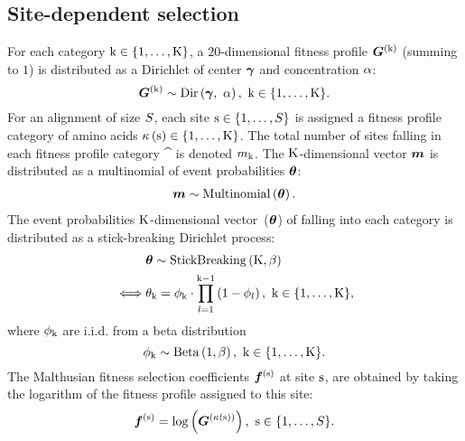 \subsection{Site-dependent selection}
\label{sec:profiles}
For each category $\text{k} \in \{1, \hdots, \text{K}\}$, a $20$-dimensional fitness profile $\bm{G}^{(\text{k})}$ (summing to $1$) is distributed as a Dirichlet of center $\bm{\gamma}$ and concentration $\alpha$:
\begin{equation}
    \label{eq:DistribBase}
    \Base\catexp \sim \mathrm{Dir}\left( \Basecenter,\ \baseconc \right),\ \Setcat.
\end{equation}
For an alignment of size $S$, each site $\text{s} \in \{1, \hdots, S\}$ is assigned a fitness profile category of amino acids $\kappa\left(\text{s}\right) \in \{1, \hdots, \text{K}\} $.
The total number of sites falling in each fitness profile category $\cat$ is denoted $m_{\text{k}}$.
The $\text{K}$-dimensional vector $\bm{m}$ is distributed as a multinomial of event probabilities $\bm{\theta}$:
\begin{align}
    \label{eq:DistribMultinomial}
    \catMultiVar \sim \mathrm{Multinomial}\left( \StickBreaking \right).
\end{align}
The event probabilities $\text{K}$-dimensional vector~($\bm{\theta}$) of falling into each category is distributed as a stick-breaking Dirichlet process:
\begin{align}
    \label{eq:DistribStickBreaking}
    \begin{split}
        & \StickBreaking \sim \mathrm{StickBreaking}\left( \Ncat, \stickbreakinghyper \right)\\
        \iff & \stickbreaking_{\cat} = \stick_{\cat}\cdot \prod _{{\indice=1}}^{{\cat-1}}\left(1-\stick_{\indice}\right),\ \Setcat,
    \end{split}
\end{align}
where $\phi_{\text{k}}$ are i.i.d.
from a beta distribution
\begin{equation}
    \label{eq:Beta}
    \stick_{\cat} \sim \mathrm{Beta}\left( 1, \stickbreakinghyper \right),\ \Setcat.
\end{equation}
The Malthusian fitness selection coefficients $\bm{f}^{(\text{s})}$ at site $\text{s}$, are obtained by taking the logarithm of the fitness profile assigned to this site:
\begin{equation}
    \label{eq:sitefitness}
    \Fit\siteexp = \log \left( \Base^{\left( \catsite \right)} \right),\ \Setsite.
\end{equation}

